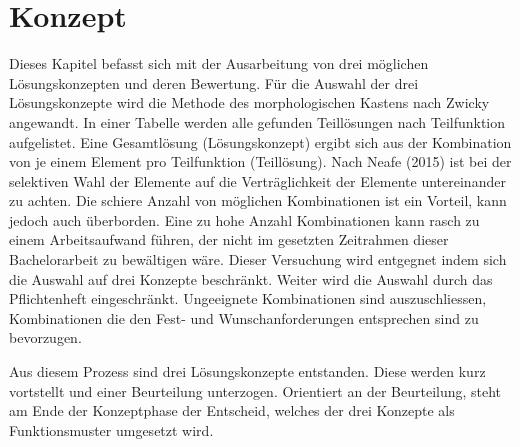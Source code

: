 \newpage
\section{Konzept}
Dieses Kapitel befasst sich mit der Ausarbeitung von drei möglichen Lösungskonzepten und deren Bewertung. Für die Auswahl der drei Lösungskonzepte wird die Methode des morphologischen Kastens nach Zwicky angewandt. In einer Tabelle werden alle gefunden Teillösungen nach Teilfunktion aufgelistet. Eine Gesamtlösung (Lösungskonzept) ergibt sich aus der Kombination von je einem Element pro Teilfunktion (Teillösung). Nach Neafe (2015) ist bei der selektiven Wahl der Elemente auf die Verträglichkeit der Elemente untereinander zu achten.
\newline
Die schiere Anzahl von möglichen Kombinationen ist ein Vorteil, kann jedoch auch überborden. Eine zu hohe Anzahl Kombinationen kann rasch zu einem Arbeitsaufwand führen, der nicht im gesetzten Zeitrahmen dieser Bachelorarbeit zu bewältigen wäre. Dieser Versuchung wird entgegnet indem sich die Auswahl auf drei Konzepte beschränkt. Weiter wird die Auswahl durch das Pflichtenheft eingeschränkt. Ungeeignete Kombinationen sind auszuschliessen, Kombinationen die den Fest- und Wunschanforderungen entsprechen sind zu bevorzugen.

Aus diesem Prozess sind drei Lösungskonzepte entstanden. Diese werden kurz vortstellt und einer Beurteilung unterzogen. Orientiert an der Beurteilung, steht am Ende der Konzeptphase der Entscheid, welches der drei Konzepte als Funktionsmuster umgesetzt wird.
